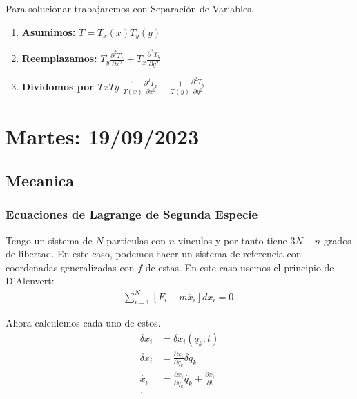 \documentclass{report}
\begin{document}
    Para solucionar trabajaremos con Separación de Variables.

    \begin{enumerate}
      \item \textbf{Asumimos:} $T = T_{x}\left( x \right) T_{y}\left( y \right) $

      \item \textbf{Reemplazamos:} $T_{y} \frac{\partial^2 T_{x}}{\partial x^2} + T_{x} \frac{\partial^2 T_{y}}{\partial y^2}$

      \item \textbf{Dividomos por $TxTy$} $\frac{1}{T\left( x \right) } \frac{\partial^2 T_{x}}{\partial x^2} + \frac{1}{T\left( y \right) } \frac{\partial^2 T_{y}}{\partial y^2}$

    \end{enumerate}

    \chapter{Martes: 19/09/2023}
    \section{Mecanica}


    \subsection{Ecuaciones de Lagrange de Segunda Especie}

    Tengo un sistema de  $N$ particulas con $n$ vinculos y por tanto tiene $3N-n$ grados de libertad. En este caso, podemos hacer un sistema de referencia con coordenadas generalizadas con $f$ de estas. En este caso usemos el principio de D'Alenvert:
    \begin{align*}
      \sum_{i=1}^{N} \left[ F_{i} - m\ddot{x_{i}} \right] dx_{i}=0
    .\end{align*}

    Ahora calculemos cada uno de estos.
    \begin{align*}
      \delta  x_{i} &= \delta x_{i}\left( q_{k},t \right) \\
      \delta x_{i} &= \frac{\partial x_{i}}{\partial q_{k}} \delta q_{k} \\
      \dot{x_{i}} &= \frac{\partial x_{i}}{\partial q_k} \dot{q_{k}} + \frac{\partial x_{i}}{\partial t}  \\
    .\end{align*}
\end{document}

